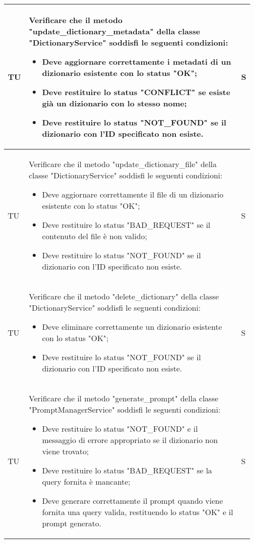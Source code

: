 \begin{adjustwidth}{-0.5cm}{-0.5cm}
\begin{longtable}{|P{1.5cm}|>{\raggedright}P{9.5cm}|>{\arraybackslash}P{1.5cm}|}
		\hline TU & Verificare che il metodo "update_dictionary_metadata" della classe "DictionaryService" soddisfi le seguenti condizioni:
		\begin{itemize}
			\item Deve aggiornare correttamente i metadati di un dizionario esistente con lo status "OK";
			\item Deve restituire lo status "CONFLICT" se esiste già un dizionario con lo stesso nome;
			\item Deve restituire lo status "NOT_FOUND" se il dizionario con l'ID specificato non esiste.
		\end{itemize} & S \\

		\hline TU & Verificare che il metodo "update_dictionary_file" della classe "DictionaryService" soddisfi le seguenti condizioni:
		\begin{itemize}
			\item Deve aggiornare correttamente il file di un dizionario esistente con lo status "OK";
			\item Deve restituire lo status "BAD_REQUEST" se il contenuto del file è non valido;
			\item Deve restituire lo status "NOT_FOUND" se il dizionario con l'ID specificato non esiste.
		\end{itemize} & S \\

		\hline TU & Verificare che il metodo "delete_dictionary" della classe "DictionaryService" soddisfi le seguenti condizioni:
		\begin{itemize}
			\item Deve eliminare correttamente un dizionario esistente con lo status "OK";
			\item Deve restituire lo status "NOT_FOUND" se il dizionario con l'ID specificato non esiste.
		\end{itemize} & S \\


		\hline TU & Verificare che il metodo "generate_prompt" della classe "PromptManagerService" soddisfi le seguenti condizioni:
		\begin{itemize}
			\item Deve restituire lo status "NOT_FOUND" e il messaggio di errore appropriato se il dizionario non viene trovato;
			\item Deve restituire lo status "BAD_REQUEST" se la query fornita è mancante;
			\item Deve generare correttamente il prompt quando viene fornita una query valida, restituendo lo status "OK" e il prompt generato.
		\end{itemize} & S \\


\end{longtable}
\end{adjustwidth}
